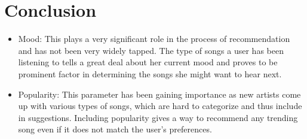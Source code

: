 	\section{Conclusion}
\begin{itemize}
	\item Mood: This plays a very significant role in the process of recommendation and has not been very widely tapped. The type of songs a user has been listening to tells a great deal about her current mood and proves to be prominent factor in determining the songs she might want to hear next.
	\item Popularity: This parameter has been gaining importance as new artists come up with various types of songs, which are hard to categorize and thus include in suggestions. Including popularity gives a way to recommend any trending song even if it does not match the user's preferences.
\end{itemize}